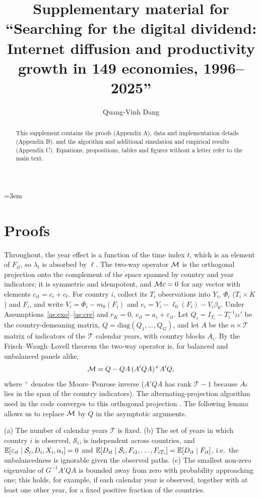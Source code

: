 \documentclass[preprint,12pt,authoryear]{elsarticle}
\begin{document}
\doublespacing
\emergencystretch=3em
\begin{frontmatter}
\title{Supplementary material for ``Searching for the digital dividend: Internet diffusion and productivity growth in 149 economies, 1996--2025''}
\ifblind\else
\author{Quang-Vinh Dang}
\fi
\begin{abstract}
This supplement contains the proofs (Appendix A), data and implementation details (Appendix B), and the algorithm and additional simulation and empirical results (Appendix C). Equations, propositions, tables and figures without a letter refer to the main text.
\end{abstract}
\end{frontmatter}

\appendix
\section{Proofs}\label{app:proofs}

Throughout, the year effect is a function of the time index $t$, which is an element of $F_{it}$, so $\lambda_t$ is absorbed by $\ell$. The two-way operator $\mathcal{M}$ is the orthogonal projection onto the complement of the space spanned by country and year indicators; it is symmetric and idempotent, and $\mathcal{M} c=0$ for any vector with elements $c_{it}=c_i+c_t$. For country $i$, collect its $T_i$ observations into $Y_i$, $\Phi_i$ ($T_i\times K$) and $F_i$, and write $V_i=\Phi_i-m_0(F_i)$ and $e_i=Y_i-\ell_0(F_i)-V_i\beta_0$. Under Assumptions~\ref{as:exo}--\ref{as:cre} and $r_K=0$, $e_{it}=a_i+\varepsilon_{it}$. Let $Q_i=I_{T_i}-T_i^{-1}\iota\iota'$ be the country-demeaning matrix, $Q=\mathrm{diag}(Q_1,\dots,Q_G)$, and let $A$ be the $n\times\mathcal T$ matrix of indicators of the $\mathcal T$ calendar years, with country blocks $A_i$. By the Frisch--Waugh--Lovell theorem the two-way operator is, for balanced and unbalanced panels alike,
\[
\mathcal{M}=Q-QA\,(A'QA)^{+}A'Q ,
\]
where $^{+}$ denotes the Moore--Penrose inverse ($A'QA$ has rank $\mathcal T-1$ because $A\iota$ lies in the span of the country indicators). The alternating-projection algorithm used in the code converges to this orthogonal projection \citep[the von Neumann--Halperin theorem; see][]{gaure2013lfe}. The following lemma allows us to replace $\mathcal{M}$ by $Q$ in the asymptotic arguments.

\begin{assumption}\label{as:panel}
(a) The number of calendar years $\mathcal T$ is fixed. (b) The set of years in which country $i$ is observed, $\mathcal S_i$, is independent across countries, and $\mathbb{E}[\varepsilon_{it}\mid \mathcal S_i,D_i,X_i,\alpha_i]=0$ and $\mathbb{E}[D_{it}\mid \mathcal S_i,F_{i1},\dots,F_{iT_i}]=\mathbb{E}[D_{it}\mid F_{it}]$, i.e.\ the unbalancedness is ignorable given the observed paths. (c) The smallest non-zero eigenvalue of $G^{-1}A'QA$ is bounded away from zero with probability approaching one; this holds, for example, if each calendar year is observed, together with at least one other year, for a fixed positive fraction of the countries.
\end{assumption}
\end{document}
